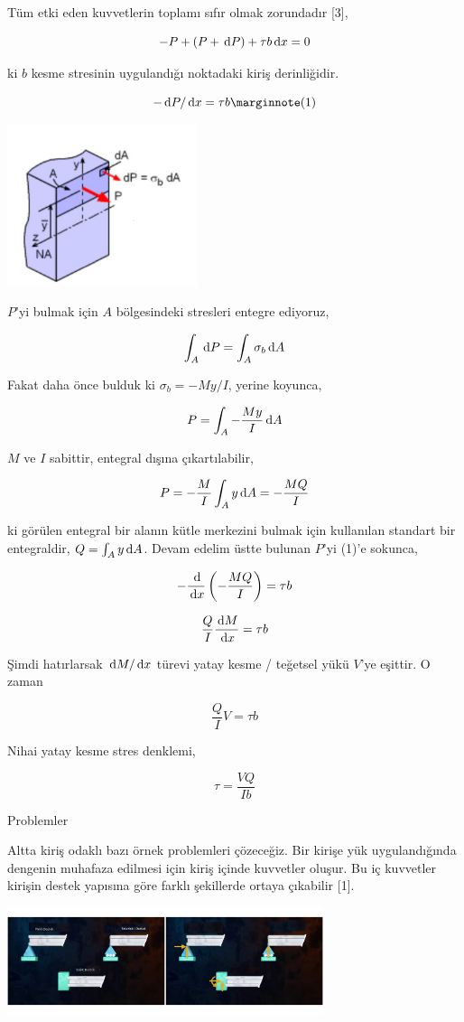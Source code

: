 \documentclass[12pt,fleqn]{article}\usepackage{../../common}
\begin{document}
Tüm etki eden kuvvetlerin toplamı sıfır olmak zorundadır [3],

$$
-P + (P + \,\mathrm{d} P) + \tau b \,\mathrm{d} x = 0
$$

ki $b$ kesme stresinin uygulandığı noktadaki kiriş derinliğidir. 

$$
-\ud P/\ud x = \tau b
\mlabel{1}
$$

\includegraphics[width=15em]{phy_020_strs_02_10.jpg}

$P$'yi bulmak için $A$ bölgesindeki stresleri entegre ediyoruz,

$$
\int_A \,\mathrm{d} P = \int_A \sigma_b \,\mathrm{d} A
$$

Fakat daha önce bulduk ki $\sigma_b = -My / I$, yerine koyunca,

$$
P = \int_A - \frac{My}{I} \,\mathrm{d} A
$$

$M$ ve $I$ sabittir, entegral dışına çıkartılabilir,

$$
P = - \frac{M}{I} \int_A y \,\mathrm{d} A = - \frac{MQ}{I}
$$

ki görülen entegral bir alanın kütle merkezini bulmak için kullanılan standart
bir entegraldir, $Q = \int_A y \,\mathrm{d} A$. Devam edelim üstte bulunan $P$'yi (1)'e
sokunca,

$$
- \frac{\,\mathrm{d}}{\,\mathrm{d} x} \left( - \frac{MQ}{I} \right) = \tau b
$$

$$
\frac{Q}{I} \frac{\,\mathrm{d} M}{\,\mathrm{d} x} = \tau b
$$

Şimdi hatırlarsak $\,\mathrm{d} M/\,\mathrm{d} x$ türevi yatay kesme / teğetsel yükü $V$'ye
eşittir. O zaman

$$
\frac{Q}{I} V = \tau b
$$

Nihai yatay kesme stres denklemi,

$$
\tau = \frac{V Q}{I b}
$$

Problemler

Altta kiriş odaklı bazı örnek problemleri çözeceğiz. Bir kirişe yük
uygulandığında dengenin muhafaza edilmesi için kiriş içinde kuvvetler oluşur.
Bu iç kuvvetler kirişin destek yapısına göre farklı şekillerde ortaya çıkabilir
[1].

\includegraphics[width=25em]{phy_020_strs_02_08.jpg}
\end{document}
